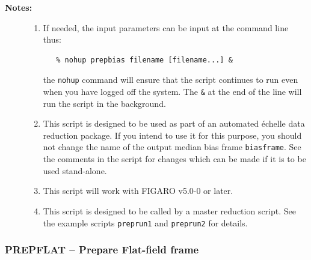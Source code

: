\documentclass[twoside,11pt]{article}
\newcommand{\stardocinitials}  {SC}
\newcommand{\stardocnumber}    {3.2-0} %
\newcommand{\stardocname}{\stardocinitials /\stardocnumber}
\newcommand{\htmlref}[2]{#1}
\newcommand{\xref}[3]{#1}
\newcommand{\xlabel}[1]{}
\newcommand{\scspec}[2]{#1}
\newcommand{\scspec}[2]{#2}
\begin{document}
\begin{description}
\item [{\bf Notes:}] \mbox{}
\begin{enumerate}

\item If needed, the input parameters can be input at the command
      line thus:

\begin{verbatim}
   % nohup prepbias filename [filename...] &
\end{verbatim}

      the \verb+nohup+ command will ensure that the script continues
      to run even when you have logged off the system.  The \verb+&+ at
      the end of the line will run the script in the background.

\item This script is designed to be used as part of an automated
      \'{e}chelle data reduction package.  If you intend to use it
      for this purpose, you should not change the name of the output
      median bias frame \verb+biasframe+.  See the comments in the script
      for changes which can be made if it is to be used stand-alone.

\item This script will work with \xref{FIGARO}{sun86}{} v5.0-0 or later.

\item This script is designed to be called by a master reduction
      script.  See the example scripts \htmlref{\texttt{preprun1}}
      {se_preprun}
      and \htmlref{\texttt{preprun2}}{se_preprun} for details.

\end{enumerate}

\end{description}


\newpage
\subsubsection{\label{se_prepflat}\xlabel{prepflat}PREPFLAT
               \scspec{--}{-} Prepare Flat-field frame}
\markboth{PREPFLAT}{\stardocname}
\end{document}
